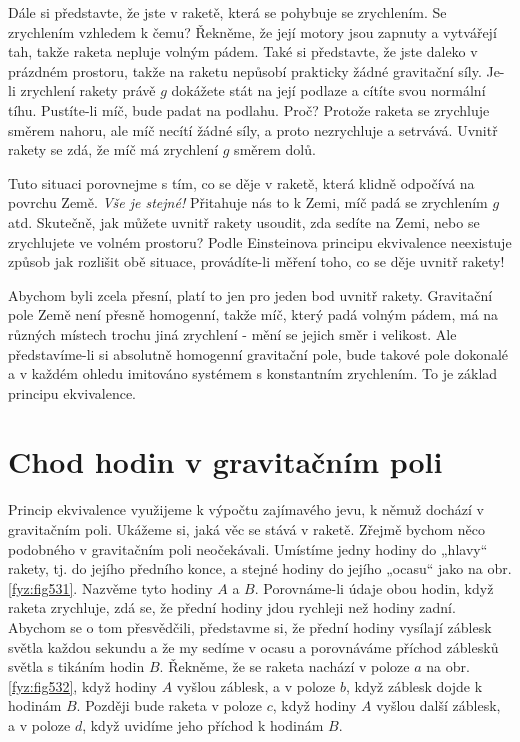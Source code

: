     Dále si představte, že jste v raketě, která se pohybuje se zrychlením. Se zrychlením vzhledem k 
    čemu? Řekněme, že její motory jsou zapnuty a vytvářejí tah, takže raketa nepluje volným pádem. 
    Také si představte, že  jste daleko v prázdném prostoru, takže na raketu nepůsobí prakticky 
    žádné gravitační síly. Je-li zrychlení rakety právě \(g\) dokážete stát na její podlaze a 
    cítíte svou normální tíhu. Pustíte-li míč, bude padat na podlahu. Proč? Protože raketa se 
    zrychluje směrem nahoru, ale míč necítí žádné síly, a proto nezrychluje a setrvává. Uvnitř 
    rakety se zdá, že míč má zrychlení \(g\) směrem dolů.
    
    Tuto situaci porovnejme s tím, co se děje v raketě, která klidně odpočívá na povrchu Země. 
    \emph{Vše je stejné!} Přitahuje nás to k Zemi, míč padá se zrychlením \(g\) atd. Skutečně, jak 
    můžete uvnitř rakety usoudit, zda sedíte na Zemi, nebo se zrychlujete ve volném prostoru? Podle 
    Einsteinova principu ekvivalence neexistuje způsob jak rozlišit obě situace, provádíte-li 
    měření toho, co se děje uvnitř rakety!
    
    Abychom byli zcela přesní, platí to jen pro jeden bod uvnitř rakety. Gravitační pole Země není 
    přesně homogenní, takže míč, který padá volným pádem, má na různých místech trochu jiná 
    zrychlení - mění se jejich směr i velikost. Ale představíme-li si absolutně homogenní 
    gravitační pole, bude takové pole dokonalé a v každém ohledu imitováno systémem s konstantním 
    zrychlením. To je základ principu ekvivalence.
    
  \section{Chod hodin v gravitačním poli}\label{fyz:IIchapXLIIsecVI}
    Princip ekvivalence využijeme k výpočtu zajímavého jevu, k němuž dochází v gravitačním poli. 
    Ukážeme si, jaká věc se stává v raketě. Zřejmě bychom něco podobného v gravitačním poli 
    neočekávali. Umístíme jedny hodiny do „hlavy“ rakety, tj. do jejího předního konce, a stejné 
    hodiny do jejího „ocasu“ jako na obr. \ref{fyz:fig531}. Nazvěme tyto hodiny \(A\) a \(B\). 
    Porovnáme-li údaje obou hodin, když raketa zrychluje, zdá se, že přední hodiny jdou rychleji 
    než hodiny zadní. Abychom se o tom přesvědčili, představme si, že přední hodiny vysílají 
    záblesk světla každou sekundu a že my sedíme v ocasu a porovnáváme příchod záblesků světla s 
    tikáním hodin \(B\). Řekněme, že se raketa nachází v poloze \(a\) na obr. \ref{fyz:fig532}, 
    když hodiny \(A\) vyšlou záblesk, a v poloze \(b\), když záblesk dojde k hodinám \(B\). Později 
    bude raketa v poloze \(c\), když hodiny \(A\) vyšlou další záblesk, a v poloze \(d\), když 
    uvidíme jeho příchod k hodinám \(B\).
    

